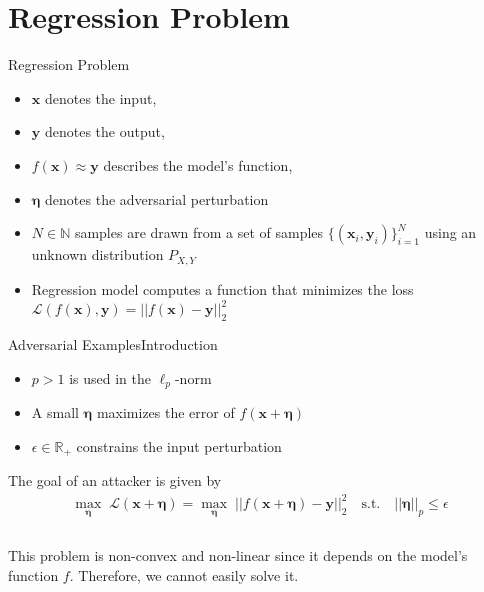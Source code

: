 \documentclass[xcolor={cmyk}]{beamer}
\newcommand{\mcl}{\mathcal}
\newcommand{\bm}{\boldsymbol}
\begin{document}
\section{Regression Problem}
\begin{frame}{Regression Problem}

	\begin{itemize}
		\item $\bm{x}$ denotes the input,
		\item $\bm{y}$ denotes the output,
		\item $f(\bm{x}) \approx \bm{y}$ describes the model's function,
		\item $\bm{\eta}$ denotes the adversarial perturbation\\[10pt]
	\end{itemize}

	\begin{definition}
	\begin{itemize}
		\item $ N \in  \mathbb{N} $ samples are drawn from a set of samples $ \{(\bm{x}_i, \bm{y}_i)\}^N_{i=1} $
		using an unknown distribution $ P_{X,Y} $
		\item Regression model computes a function that minimizes the loss $ \mcl{L}(f(\bm{x}), \bm{y}) = \lvert\lvert f(\bm{x}) - \bm{y} \rvert\rvert^2_2 $
	\end{itemize}
	\end{definition}
\end{frame}


\begin{frame}{Adversarial Examples}{Introduction}

	\begin{itemize}
		\item $p > 1$ is used in the $\ell_p$-norm
		\item A small $\bm{\eta}$ maximizes the error of $f(\bm{x} + \bm{\eta})$
		\item $\epsilon \in \mathbb{R}_{+}$ constrains the input perturbation\\[20pt]
	\end{itemize}

	The goal of an attacker is given by
	\begin{equation*}
	\begin{aligned}
		\max_{ \bm{\eta} } \; \mcl{L}(\bm{x} + \bm{\eta}) = \max_{ \bm{\eta} } \; \lvert\lvert f(\bm{x} + \bm{\eta}) - \bm{y} \rvert\rvert^2_2 \quad \text{s.t.} \quad \lvert\lvert \bm{\eta} \rvert\rvert_p  \leq \epsilon \\
	\end{aligned}
	\end{equation*}\\[10pt]

	This problem is non-convex and non-linear since it depends on the model's function $f$. Therefore, we cannot easily solve it.

\end{frame}
\end{document}
